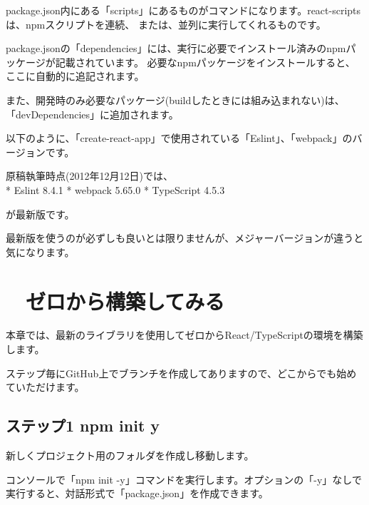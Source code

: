 package.json内にある「scripts」にあるものがコマンドになります。react{-}scriptsは、npmスクリプトを連続、
または、並列に実行してくれるものです。

\vspace*{\baselineskip}

package.jsonの「dependencies」には、実行に必要でインストール済みのnpmパッケージが記載されています。
必要なnpmパッケージをインストールすると、ここに自動的に追記されます。

\vspace*{\baselineskip}

また、開発時のみ必要なパッケージ(buildしたときには組み込まれない)は、「devDependencies」に追加されます。

\vspace*{\baselineskip}

以下のように、「create{-}react{-}app」で使用されている「Eslint」、「webpack」のバージョンです。

原稿執筆時点(2012年12月12日)では、\\[0pt]
* Eslint 8.4.1
* webpack 5.65.0
* TypeScript 4.5.3

が最新版です。

最新版を使うのが必ずしも良いとは限りませんが、メジャーバージョンが違うと気になります。

\section{　ゼロから構築してみる}
\keeplastskip{
  \label{sec:2-2}
  \label{sec-04-start}
  \par\nobreak
}

本章では、最新のライブラリを使用してゼロからReact/TypeScriptの環境を構築します。

ステップ毎にGitHub上でブランチを作成してありますので、どこからでも始めていただけます。

\subsection{ステップ1 npm init y}
\keeplastskip{
  \label{sec:2-2-1}
  \label{sec-04-node_init}
  \par\nobreak
}

新しくプロジェクト用のフォルダを作成し移動します。

コンソールで「npm init {-}y」コマンドを実行します。オプションの「{-}y」なしで実行すると、対話形式で「package.json」を作成できます。

